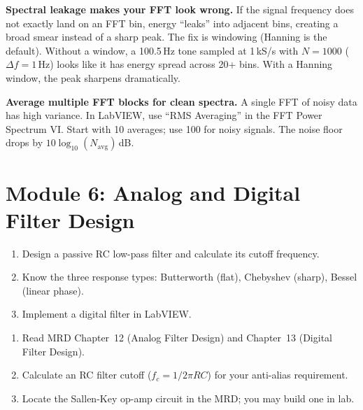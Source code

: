 \documentclass[11pt,letterpaper]{article}
\begin{document}
\begin{warnbox}
\textbf{Spectral leakage makes your FFT look wrong.} If the signal frequency does not exactly land on an FFT bin, energy ``leaks'' into adjacent bins, creating a broad smear instead of a sharp peak. The fix is windowing (Hanning is the default). Without a window, a 100.5\,Hz tone sampled at 1\,kS/s with $N = 1000$ ($\Delta f = 1$\,Hz) looks like it has energy spread across 20+ bins. With a Hanning window, the peak sharpens dramatically.
\end{warnbox}

\begin{protip}
\textbf{Average multiple FFT blocks for clean spectra.} A single FFT of noisy data has high variance. In LabVIEW, use ``RMS Averaging'' in the FFT Power Spectrum VI. Start with 10 averages; use 100 for noisy signals. The noise floor drops by $10\log_{10}(N_{\text{avg}})$\,dB.
\end{protip}

\section{Module 6: Analog and Digital Filter Design}

\begin{priorities}
\begin{enumerate}[leftmargin=*, itemsep=1pt, topsep=0pt]
    \item Design a passive RC low-pass filter and calculate its cutoff frequency.
    \item Know the three response types: Butterworth (flat), Chebyshev (sharp), Bessel (linear phase).
    \item Implement a digital filter in LabVIEW.
\end{enumerate}
\end{priorities}

\begin{tcolorbox}[colback=minesblue!3, colframe=minesblue!40, boxrule=0.5pt, arc=2pt, left=6pt, right=6pt, top=3pt, bottom=3pt, fonttitle=\small\bfseries\color{minesblue}, title={Before You Start: Module 6}]
\small
\begin{enumerate}[nosep,leftmargin=*]
\item Read MRD Chapter~12 (Analog Filter Design) and Chapter~13 (Digital Filter Design).
\item Calculate an RC filter cutoff ($f_c = 1/2\pi RC$) for your anti-alias requirement.
\item Locate the Sallen-Key op-amp circuit in the MRD; you may build one in lab.
\end{enumerate}
\end{tcolorbox}
\end{document}
